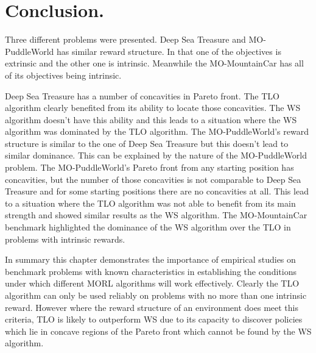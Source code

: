 \section{Conclusion.}
Three different problems were presented. Deep Sea Treasure and MO-PuddleWorld has similar reward structure. In that one of the objectives is extrinsic and the other one is intrinsic. Meanwhile the MO-MountainCar has all of its objectives being intrinsic.

Deep Sea Treasure has a number of concavities in Pareto front. The TLO algorithm clearly benefited from its ability to locate those concavities. The WS algorithm doesn’t have this ability and this leads to a situation where the WS algorithm was dominated by the TLO algorithm. The MO-PuddleWorld’s reward structure is similar to the one of Deep Sea Treasure but this doesn’t lead to similar dominance. This can be explained by the nature of the MO-PuddleWorld problem. The MO-PuddleWorld’s Pareto front from any starting position has concavities, but the number of those concavities is not comparable to Deep Sea Treasure and for some starting positions there are no concavities at all. This lead to a situation where the TLO algorithm was not able to benefit from its main strength and showed similar results as the WS algorithm. The MO-MountainCar benchmark highlighted the dominance of the WS algorithm over the TLO in problems with intrinsic rewards.

In summary this chapter demonstrates the importance of empirical studies on benchmark problems with known characteristics in establishing the conditions under which different MORL algorithms will work effectively. Clearly the TLO algorithm can only be used reliably on problems with no more than one intrinsic reward. However where the reward structure of an environment does meet this criteria, TLO is likely to outperform WS due to its capacity to discover policies which lie in concave regions of the Pareto front which cannot be found by the WS algorithm.
